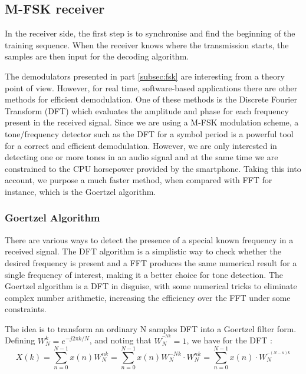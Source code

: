 \documentclass[12pt,a4paper,openright]{report}
\begin{document}
 
  
\subsection{M-FSK receiver}
In the receiver side, the first step is to synchronise and find the beginning of the training sequence. When the receiver knows where the transmission starts, the samples are then input for the decoding algorithm. 

The demodulators presented in part \ref{subsec:fsk} are interesting from a theory point of view. However, for real time, software-based applications there are other methods for efficient demodulation. One of these methods is the Discrete Fourier Transform (DFT) which evaluates the amplitude and phase for each frequency present in the received signal. Since we are using a M-FSK modulation scheme, a tone/frequency detector such as the DFT for a symbol period is a powerful tool for a correct and efficient demodulation. However, we are only interested in detecting one or more tones in an audio signal and at the same time we are constrained to the CPU horsepower provided by the smartphone. Taking this into account, we purpose a much faster method, when compared with FFT for instance, which is the Goertzel algorithm. 


\subsubsection{Goertzel Algorithm}
\label{sec:FSKdemod}

There are various ways to detect the presence of a special known frequency in a received signal. The DFT algorithm is a simplistic way to check whether the desired frequency is present and a FFT produces the same numerical result for a single frequency of interest, making it a better choice for tone detection. The Goertzel algorithm is a DFT in disguise, with some numerical tricks to eliminate complex number arithmetic, increasing the efficiency over the FFT under some constraints.

The idea is to transform an ordinary N samples DFT into a Goertzel filter form. Defining $W_N^{k}={e^{ - j2\pi k/N}}$, and noting that $W_N^{^{ - Nk}} = 1$, we have for the DFT \cite{GoertzelPaper}:
\begin{equation}
X(k) = \sum\limits_{n = 0}^{N - 1} {x(n)W_N^{nk}}  = \sum\limits_{n = 0}^{N - 1} {x(n)W_N^{ - Nk} \cdot W_N^{nk}}  = \sum\limits_{n = 0}^{N - 1} {x(n) \cdot W_N^{^{ - (N - n)k}}} 
\end{equation}
\end{document}
